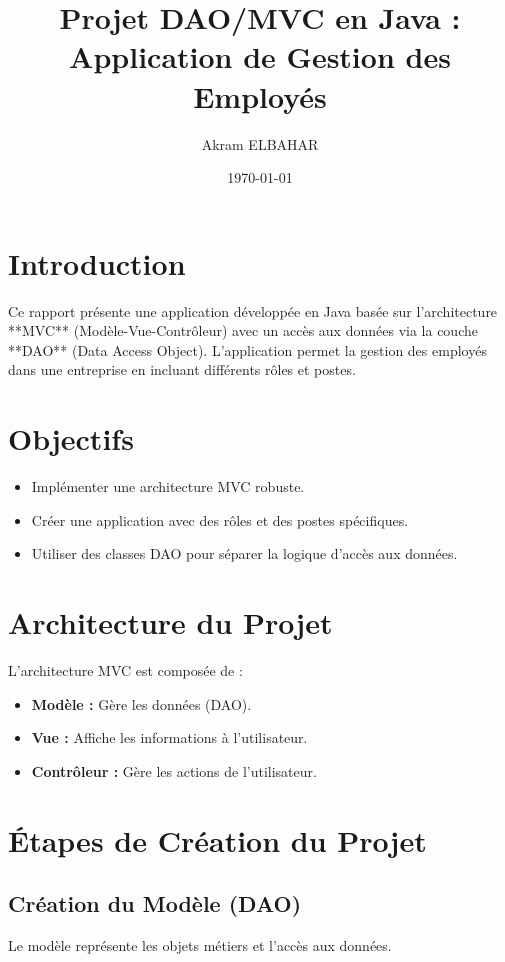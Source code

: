 \documentclass[12pt,a4paper]{article}
\title{Projet DAO/MVC en Java : Application de Gestion des Employés}
\author{Akram ELBAHAR}
\date{\today}
\begin{document}
\maketitle

\tableofcontents

\newpage

\section{Introduction}
Ce rapport présente une application développée en Java basée sur l'architecture **MVC** (Modèle-Vue-Contrôleur) avec un accès aux données via la couche **DAO** (Data Access Object).  
L'application permet la gestion des employés dans une entreprise en incluant différents rôles et postes.

\section{Objectifs}
\begin{itemize}
    \item Implémenter une architecture MVC robuste.
    \item Créer une application avec des rôles et des postes spécifiques.
    \item Utiliser des classes DAO pour séparer la logique d'accès aux données.
\end{itemize}

\section{Architecture du Projet}
L'architecture MVC est composée de :  
\begin{itemize}
    \item \textbf{Modèle :} Gère les données (DAO).
    \item \textbf{Vue :} Affiche les informations à l'utilisateur.
    \item \textbf{Contrôleur :} Gère les actions de l'utilisateur.
\end{itemize}

\section{Étapes de Création du Projet}

\subsection{Création du Modèle (DAO)}
Le modèle représente les objets métiers et l'accès aux données.
\end{document}
